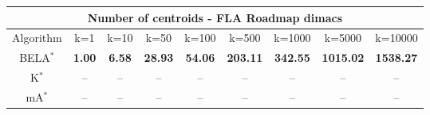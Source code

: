 \begin{tabular}{c|cccccccc}\toprule
\multicolumn{9}{c}{Number of centroids - FLA Roadmap dimacs}\\ \midrule
Algorithm & k=1 & k=10 & k=50 & k=100 & k=500 & k=1000 & k=5000 & k=10000 \\ \midrule
BELA$^*$ & \textbf{1.00} & \textbf{6.58} & \textbf{28.93} & \textbf{54.06} & \textbf{203.11} & \textbf{342.55} & \textbf{1015.02} & \textbf{1538.27} \\
K$^*$ & -- & -- & -- & -- & -- & -- & -- & -- \\
mA$^*$ & -- & -- & -- & -- & -- & -- & -- & -- \\ \bottomrule 
\end{tabular}
